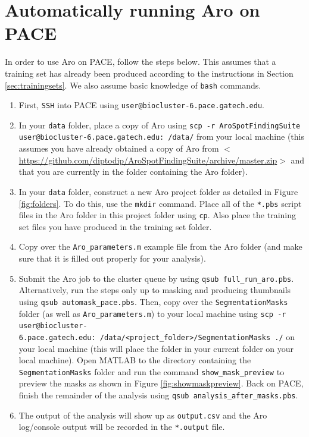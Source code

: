 \documentclass[titlepage,11pt]{article}
\begin{document}
\section{Automatically running Aro on PACE} \label{sec:paceguide}

In order to use Aro on PACE, follow the steps below. This assumes that a training set has already been produced according to the instructions in Section \ref{sec:trainingsets}. We also assume basic knowledge of \texttt{bash} commands.
\begin{enumerate}
\item First, \texttt{SSH} into PACE using \texttt{user@biocluster-6.pace.gatech.edu}.
\item In your \texttt{data} folder, place a copy of Aro using \texttt{scp -r AroSpotFindingSuite user@biocluster-6.pace.gatech.edu:~/data/} from your local machine (this assumes you have already obtained a copy of Aro from $<$\href{https://github.com/diptodip/AroSpotFindingSuite/archive/master.zip}{https://github.com/diptodip/AroSpotFindingSuite/archive/master.zip}$>$ and that you are currently in the folder containing the Aro folder).
\item In your \texttt{data} folder, construct a new Aro project folder as detailed in Figure \ref{fig:folders}. To do this, use the \texttt{mkdir} command. Place all of the \texttt{*.pbs} script files in the Aro folder in this project folder using \texttt{cp}. Also place the training set files you have produced in the training set folder.
\item Copy over the \texttt{Aro\_parameters.m} example file from the Aro folder (and make sure that it is filled out properly for your analysis).
\item Submit the Aro job to the cluster queue by using \texttt{qsub full\_run\_aro.pbs}.
    \subitem Alternatively, run the steps only up to masking and producing thumbnails using \texttt{qsub automask\_pace.pbs}.
    \subitem Then, copy over the \texttt{SegmentationMasks} folder (as well as \texttt{Aro\_parameters.m}) to your local machine using \texttt{scp -r user@biocluster-6.pace.gatech.edu:~/data/<project\_folder>/SegmentationMasks ./} on your local machine (this will place the folder in your current folder on your local machine).
    \subitem Open MATLAB to the directory containing the \texttt{SegmentationMasks} folder and run the command \texttt{show\_mask\_preview} to preview the masks as shown in Figure \ref{fig:showmaskpreview}.
    \subitem Back on PACE, finish the remainder of the analysis using \texttt{qsub analysis\_after\_masks.pbs}.
\item The output of the analysis will show up as \texttt{output.csv} and the Aro log/console output will be recorded in the \texttt{*.output} file.
\end{enumerate}
\end{document}
